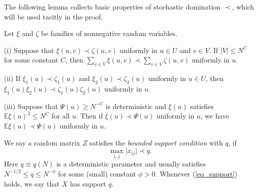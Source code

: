 \documentclass{article}
\begin{document}
The following lemma collects basic properties of stochastic domination $\prec$, which will be used tacitly in the proof.

\begin{lemma}\label{lem_stodomin}
Let $\xi$ and $\zeta$ be families of nonnegative random variables.

(i) Suppose that $\xi (u,v)\prec \zeta(u,v)$ uniformly in $u\in U$ and $v\in V$. If $|V|\le N^C$ for some constant $C$, then $\sum_{v\in V} \xi(u,v) \prec \sum_{v\in V} \zeta(u,v)$ uniformly in $u$.

(ii) If $\xi_1 (u)\prec \zeta_1(u)$ and $\xi_2 (u)\prec \zeta_2(u)$ uniformly in $u\in U$, then $\xi_1(u)\xi_2(u) \prec \zeta_1(u)\zeta_2(u)$ uniformly in $u$.

(iii) Suppose that $\Psi(u)\ge N^{-C}$ is deterministic and $\xi(u)$ satisfies $\mathbb E\xi(u)^2 \le N^C$ for all $u$. Then if $\xi(u)\prec \Psi(u)$ uniformly in $u$, we have $\mathbb E\xi(u) \prec \Psi(u)$ uniformly in $u$.
\end{lemma}


\begin{definition} \label{defn_support}
We say a random matrix $Z$ satisfies the {\it{bounded support condition}} with $q$, if
\begin{equation}
\max_{i,j}\vert x_{ij}\vert \prec q. \label{eq_support}
\end{equation}
Here $q\equiv q(N)$ is a deterministic parameter and usually satisfies $ N^{-{1}/{2}} \leq q \leq N^{- \phi} $ for some (small) constant $\phi>0$. Whenever (\ref{eq_support}) holds, we say that $X$ has support $q$. 
\end{definition}

\end{document}
